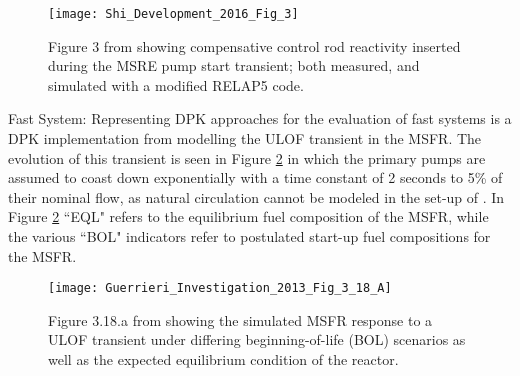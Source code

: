 \documentclass[review]{elsarticle}
\begin{document}
\begin{figure}[H]
   \centering
   \texttt{[image: Shi\_Development\_2016\_Fig\_3]}
   \caption{Figure 3 from \cite{shi_development_2016} showing 
    compensative control rod reactivity inserted during the MSRE pump start
   transient; both measured, and simulated with a modified RELAP5 code.} 
   \label{fig:shi_msre_ps}
\end{figure}

\par Fast System: Representing DPK approaches for the evaluation of fast
systems is a DPK implementation from \cite{guerrieri_investigation_2013}
modelling the ULOF transient in the MSFR. The evolution of this transient is
seen in Figure \ref{fig:guerrieri_msfr_ulof} in which the primary pumps are
assumed to coast down exponentially with a time constant of 2 seconds to 5\%
 of their nominal flow, as natural circulation cannot be modeled in the set-up
of \cite{guerrieri_investigation_2013}. In Figure 
\ref{fig:guerrieri_msfr_ulof} 
``EQL" refers to the equilibrium fuel composition of the
MSFR, while the various ``BOL" indicators refer to postulated start-up fuel
compositions for the MSFR. 

\begin{figure}[H]
   \centering
   \texttt{[image: Guerrieri\_Investigation\_2013\_Fig\_3\_18\_A]}
   \caption{Figure 3.18.a from \cite{guerrieri_investigation_2013} showing the simulated MSFR
   response to a ULOF transient under differing beginning-of-life (BOL) scenarios as well as the
   expected equilibrium condition of the reactor.} 
   \label{fig:guerrieri_msfr_ulof}
\end{figure}
\end{document}
